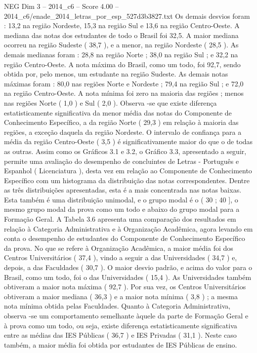 \begin{textsample}{NEG Dim 3 – 2014\_c6 – Score 4.00 – 2014\_c6/enade\_2014\_letras\_por\_esp\_527d3b3827.txt}
Os demais desvios foram : 13,2 na região Nordeste, 15,3 na região Sul e 13,6 na região Centro-Oeste.
A mediana das notas dos estudantes de todo o Brasil foi 32,5.
A maior mediana ocorreu na região Sudeste ( 38,7 ), e a menor, na região Nordeste ( 28,5 ).
As demais medianas foram : 28,8 na região Norte ; 38,0 na região Sul ; e 32,2 na região Centro-Oeste.
A nota máxima do Brasil, como um todo, foi 92,7, sendo obtida por, pelo menos, um estudante na região Sudeste.
As demais notas máximas foram : 80,0 nas regiões Norte e Nordeste ; 79,4 na região Sul ; e 72,0 na região Centro-Oeste.
A nota mínima foi zero na maioria das regiões ; menos nas regiões Norte ( 1,0 ) e Sul ( 2,0 ).
Observa -se que existe diferença estatisticamente significativa da menor média das notas do Componente de Conhecimento Específico, a da região Norte ( 29,3 ) em relação à maioria das regiões, a exceção daquela da região Nordeste.
O intervalo de confiança para a média da região Centro-Oeste ( 3,5 ) é significativamente maior do que o de todas as outras.
Assim como os Gráficos 3.1 e 3.2, o Gráfico 3.3, apresentado a seguir, permite uma avaliação do desempenho de concluintes de Letras - Português e Espanhol ( Licenciatura ), desta vez em relação ao Componente de Conhecimento Específico com um histograma da distribuição das notas correspondentes.
Dentre as três distribuições apresentadas, esta é a mais concentrada nas notas baixas.
Esta também é uma distribuição unimodal, e o grupo modal é o ( 30 ; 40 ], o mesmo grupo modal da prova como um todo e abaixo do grupo modal para a Formação Geral.
A Tabela 3.6 apresenta uma comparação dos resultados em relação à Categoria Administrativa e à Organização Acadêmica, agora levando em conta o desempenho de estudantes do Componente de Conhecimento Específico da prova.
No que se refere à Organização Acadêmica, a maior média foi dos Centros Universitários ( 37,4 ), vindo a seguir a das Universidades ( 34,7 ) e, depois, a das Faculdades ( 30,7 ).
O maior desvio padrão, e acima do valor para o Brasil, como um todo, foi o das Universidades ( 15,4 ).
As Universidades também obtiveram a maior nota máxima ( 92,7 ).
Por sua vez, os Centros Universitários obtiveram a maior mediana ( 36,3 ) e a maior nota mínima ( 3,8 ) ; a mesma nota mínima obtida pelas Faculdades.
Quanto à Categoria Administrativa, observa -se um comportamento semelhante àquele da parte de Formação Geral e à prova como um todo, ou seja, existe diferença estatisticamente significativa entre as médias das IES Públicas ( 36,7 ) e IES Privadas ( 31,1 ).
Neste caso também, a maior média foi obtida por estudantes de IES Públicas de ensino.

\end{textsample}
